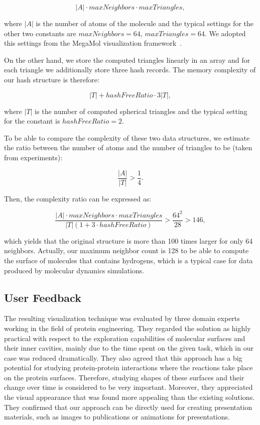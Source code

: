 \begin{equation}
|A| \cdot maxNeighbors \cdot maxTriangles,
\end{equation}

where $|A|$ is the number of atoms of the molecule and the typical settings for the other two constants are $maxNeighbors = 64$, $maxTriangles = 64$.
We adopted this settings from the MegaMol visualization framework~\cite{grottel2015megamol}.

On the other hand, we store the computed triangles linearly in an array and for each triangle we additionally store three hash records. 
The memory complexity of our hash structure is therefore:

\begin{equation}
|T| + hashFreeRatio \cdot 3 |T|,
\end{equation}

where $|T|$ is the number of computed spherical triangles and the typical setting for the constant is $hashFreeRatio = 2$. 

To be able to compare the complexity of these two data structures, we estimate the ratio between the number of atoms and the number of triangles to be (taken from experiments):

\begin{equation}
\frac{|A|}{|T|} > \frac{1}{4}.
\end{equation}

Then, the complexity ratio can be expressed as:

\begin{equation}
\frac{|A| \cdot maxNeighbors \cdot maxTriangles}{|T|(1 + 3 \cdot hashFreeRatio)} > \frac{64^2}{28} > 146,
\end{equation}

which yields that the original structure is more than 100 times larger for only 64 neighbors.
Actually, our maximum neighbor count is 128 to be able to compute the surface of molecules that contains hydrogens, which is a typical case for data produced by molecular dynamics simulations.


\subsection{User Feedback}
The resulting visualization technique was evaluated by three domain experts working in the field of protein engineering. They regarded the solution as highly practical with respect to the exploration capabilities of molecular surfaces and their inner cavities, mainly due to the time spent on the given task, which in our case was reduced dramatically.
They also agreed that this approach has a big potential for studying protein-protein interactions where the reactions take place on the protein surfaces.
Therefore, studying shapes of these surfaces and their change over time is considered to be very important.
Moreover, they appreciated the visual appearance that was found more appealing than the existing solutions.
They confirmed that our approach can be directly used for creating presentation materials, such as images to publications or animations for presentations.


